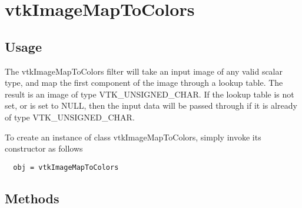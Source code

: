 \section{vtkImageMapToColors}

\subsection{Usage}

 The vtkImageMapToColors filter will take an input image of any valid
 scalar type, and map the first component of the image through a
 lookup table.  The result is an image of type VTK\_UNSIGNED\_CHAR.
 If the lookup table is not set, or is set to NULL, then the input
 data will be passed through if it is already of type VTK\_UNSIGNED\_CHAR.

To create an instance of class vtkImageMapToColors, simply
invoke its constructor as follows
\begin{verbatim}
  obj = vtkImageMapToColors
\end{verbatim}
\subsection{Methods}

